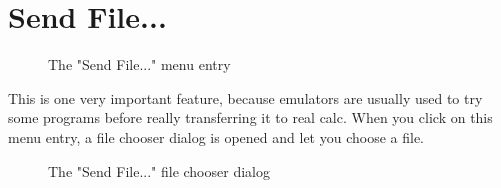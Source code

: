 \documentclass[10pt]{report}
\begin{document}
\section{Send File...}

\begin{figure}[H]
\centering
{}
\caption{The "Send File..." menu entry}
\end{figure}
This is one very important feature, because emulators are usually used to try some programs before really transferring it to real calc.\newline\newline
When you click on this menu entry, a file chooser dialog is opened and let you choose a file.\newline
\begin{figure}[H]
\centering
{}
\caption{The "Send File..." file chooser dialog}
\end{figure}
\end{document}
